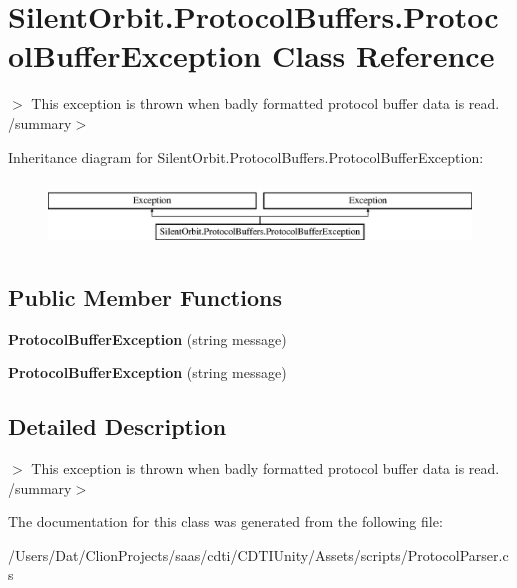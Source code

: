 \hypertarget{class_silent_orbit_1_1_protocol_buffers_1_1_protocol_buffer_exception}{}\section{Silent\+Orbit.\+Protocol\+Buffers.\+Protocol\+Buffer\+Exception Class Reference}
\label{class_silent_orbit_1_1_protocol_buffers_1_1_protocol_buffer_exception}


$>$ This exception is thrown when badly formatted protocol buffer data is read. /summary$>$  


Inheritance diagram for Silent\+Orbit.\+Protocol\+Buffers.\+Protocol\+Buffer\+Exception\+:\begin{figure}[H]
\begin{center}
\leavevmode
\includegraphics[height=1.794872cm]{class_silent_orbit_1_1_protocol_buffers_1_1_protocol_buffer_exception}
\end{center}
\end{figure}
\subsection*{Public Member Functions}
\begin{DoxyCompactItemize}
\item 
{\bfseries Protocol\+Buffer\+Exception} (string message)\hypertarget{class_silent_orbit_1_1_protocol_buffers_1_1_protocol_buffer_exception_a6028c070a3feff745b455ff61e9fd616}{}\label{class_silent_orbit_1_1_protocol_buffers_1_1_protocol_buffer_exception_a6028c070a3feff745b455ff61e9fd616}

\item 
{\bfseries Protocol\+Buffer\+Exception} (string message)\hypertarget{class_silent_orbit_1_1_protocol_buffers_1_1_protocol_buffer_exception_a6028c070a3feff745b455ff61e9fd616}{}\label{class_silent_orbit_1_1_protocol_buffers_1_1_protocol_buffer_exception_a6028c070a3feff745b455ff61e9fd616}

\end{DoxyCompactItemize}


\subsection{Detailed Description}
$>$ This exception is thrown when badly formatted protocol buffer data is read. /summary$>$ 

The documentation for this class was generated from the following file\+:\begin{DoxyCompactItemize}
\item 
/\+Users/\+Dat/\+Clion\+Projects/saas/cdti/\+C\+D\+T\+I\+Unity/\+Assets/scripts/Protocol\+Parser.\+cs\end{DoxyCompactItemize}
